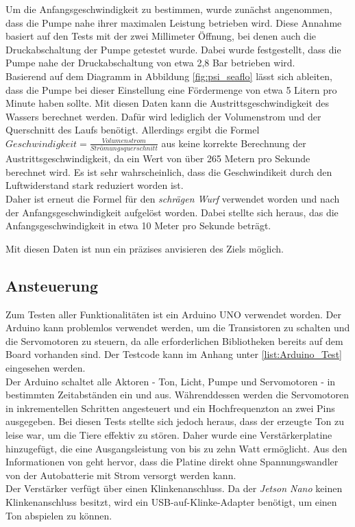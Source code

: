 Um die Anfangsgeschwindigkeit zu bestimmen, wurde zunächst angenommen, dass die Pumpe nahe ihrer maximalen Leistung betrieben wird. Diese Annahme basiert auf den Tests mit der zwei Millimeter Öffnung, bei denen auch die Druckabschaltung der Pumpe getestet wurde. Dabei wurde festgestellt, dass die Pumpe nahe der Druckabschaltung von etwa 2,8 Bar betrieben wird.
\\
Basierend auf dem Diagramm in Abbildung \ref{fig:psi_seaflo} lässt sich ableiten, dass die Pumpe bei dieser Einstellung eine Fördermenge von etwa 5 Litern pro Minute haben sollte. Mit diesen Daten kann die Austrittsgeschwindigkeit des Wassers berechnet werden. Dafür wird lediglich der Volumenstrom und der Querschnitt des Laufs benötigt. Allerdings ergibt die Formel $Geschwindigkeit = \frac{Volumenstrom}{Strömungsquerschnitt}$ aus \cite{stroemungen} keine korrekte Berechnung der Austrittsgeschwindigkeit, da ein Wert von über 265 Metern pro Sekunde berechnet wird. Es ist sehr wahrscheinlich, dass die Geschwindikeit durch den Luftwiderstand stark reduziert worden ist.
\\
Daher ist erneut die Formel für den \textit{schrägen Wurf} verwendet worden und nach der Anfangsgeschwindigkeit aufgelöst worden. Dabei stellte sich heraus, das die Anfangsgeschwindigkeit in etwa 10 Meter pro Sekunde beträgt.

Mit diesen Daten ist nun ein präzises anvisieren des Ziels möglich.

\subsection{Ansteuerung}

Zum Testen aller Funktionalitäten ist ein Arduino UNO verwendet worden. Der Arduino kann problemlos verwendet werden, um die Transistoren zu schalten und die Servomotoren zu steuern, da alle erforderlichen Bibliotheken bereits auf dem Board vorhanden sind. Der Testcode kann im Anhang unter \ref{list:Arduino_Test} eingesehen werden.
\\
Der Arduino schaltet alle Aktoren - Ton, Licht, Pumpe und Servomotoren - in bestimmten Zeitabständen ein und aus. Währenddessen werden die Servomotoren in inkrementellen Schritten angesteuert und ein Hochfrequenzton an zwei Pins ausgegeben. Bei diesen Tests stellte sich jedoch heraus, dass der erzeugte Ton zu leise war, um die Tiere effektiv zu stören. Daher wurde eine Verstärkerplatine hinzugefügt, die eine Ausgangsleistung von bis zu zehn Watt ermöglicht. Aus den Informationen von \cite{am_sound_amp} geht hervor, dass die Platine direkt ohne Spannungswandler von der Autobatterie mit Strom versorgt werden kann.
\\
Der Verstärker verfügt über einen Klinkenanschluss. Da der \textit{Jetson Nano} keinen Klinkenanschluss besitzt, wird ein USB-auf-Klinke-Adapter benötigt, um einen Ton abspielen zu können.

